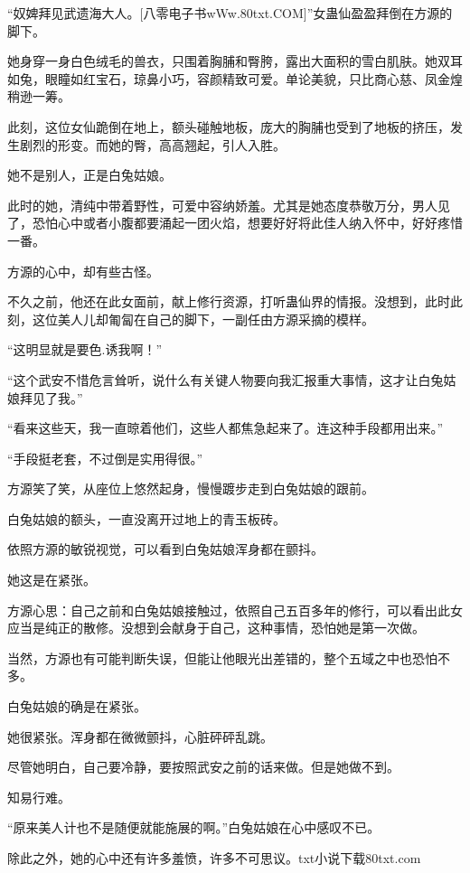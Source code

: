 
\begin{this_body}

“奴婢拜见武遗海大人。[八零电子书wWw.80txt.COM]”女蛊仙盈盈拜倒在方源的脚下。

她身穿一身白色绒毛的兽衣，只围着胸脯和臀胯，露出大面积的雪白肌肤。她双耳如兔，眼瞳如红宝石，琼鼻小巧，容颜精致可爱。单论美貌，只比商心慈、凤金煌稍逊一筹。

此刻，这位女仙跪倒在地上，额头碰触地板，庞大的胸脯也受到了地板的挤压，发生剧烈的形变。而她的臀，高高翘起，引人入胜。

她不是别人，正是白兔姑娘。

此时的她，清纯中带着野性，可爱中容纳娇羞。尤其是她态度恭敬万分，男人见了，恐怕心中或者小腹都要涌起一团火焰，想要好好将此佳人纳入怀中，好好疼惜一番。

方源的心中，却有些古怪。

不久之前，他还在此女面前，献上修行资源，打听蛊仙界的情报。没想到，此时此刻，这位美人儿却匍匐在自己的脚下，一副任由方源采摘的模样。

“这明显就是要色.诱我啊！”

“这个武安不惜危言耸听，说什么有关键人物要向我汇报重大事情，这才让白兔姑娘拜见了我。”

“看来这些天，我一直晾着他们，这些人都焦急起来了。连这种手段都用出来。”

“手段挺老套，不过倒是实用得很。”

方源笑了笑，从座位上悠然起身，慢慢踱步走到白兔姑娘的跟前。

白兔姑娘的额头，一直没离开过地上的青玉板砖。

依照方源的敏锐视觉，可以看到白兔姑娘浑身都在颤抖。

她这是在紧张。

方源心思：自己之前和白兔姑娘接触过，依照自己五百多年的修行，可以看出此女应当是纯正的散修。没想到会献身于自己，这种事情，恐怕她是第一次做。

当然，方源也有可能判断失误，但能让他眼光出差错的，整个五域之中也恐怕不多。

白兔姑娘的确是在紧张。

她很紧张。浑身都在微微颤抖，心脏砰砰乱跳。

尽管她明白，自己要冷静，要按照武安之前的话来做。但是她做不到。

知易行难。

“原来美人计也不是随便就能施展的啊。”白兔姑娘在心中感叹不已。

除此之外，她的心中还有许多羞愤，许多不可思议。txt小说下载80txt.com


\end{this_body}

